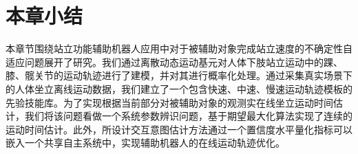 \section{本章小结}
本章节围绕站立功能辅助机器人应用中对于被辅助对象完成站立速度的不确定性自适应问题展开了研究。我们通过离散动态运动基元对人体下肢站立运动中的踝、膝、髋关节的运动轨迹进行了建模，并对其进行概率化处理。通过采集真实场景下的人体坐立离线运动数据，我们建立了一个包含快速、中速、慢速运动轨迹模板的先验技能库。为了实现根据当前部分对被辅助对象的观测实在线坐立运动时间估计，我们将该问题看做一个系统参数辨识问题，基于期望最大化算法实现了连续的运动时间估计。此外，所设计交互意图估计方法通过一个置信度水平量化指标可以嵌入一个共享自主系统中，实现辅助机器人的在线运动轨迹优化。
